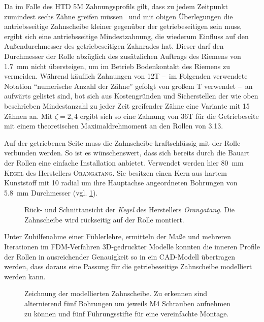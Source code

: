 		Da im Falle des HTD 5M Zahnungsprofils gilt, dass zu jedem Zeitpunkt zumindest sechs Zähne greifen müssen~\cite{MAEDLERGmbH.2021} und mit obigen Überlegungen die antriebsseitige Zahnscheibe kleiner gegenüber der getriebeseitigen sein muss, ergibt sich eine antriebsseitige Mindestzahnung, die wiederum Einfluss auf den Außendurchmesser des getriebeseitigen Zahnrades hat.
		Dieser darf den Durchmesser der Rolle abzüglich des zusätzlichen Auftrags des Riemens von \qty{1,7}{\milli\metre}\cite{gates.catalogue.2021} nicht übersteigen, um im Betrieb Bodenkontakt des Riemens zu vermeiden.
		Während käuflich Zahnungen von 12T --~im Folgenden verwendete Notation ``numerische Anzahl der Zähne'' gefolgt von großem T verwendet --~an aufwärts gelistet sind, bot sich aus Kostengründen und Sicherstellen der wie oben beschrieben Mindestanzahl zu jeder Zeit greifender Zähne eine Variante mit 15 Zähnen an.
		Mit \(\zeta=2,4\) ergibt sich so eine Zahnung von 36T für die Getriebeseite mit einem theoretischen Maximaldrehmoment an den Rollen von \qty{3,13}{\newtonmetre}.\par\medskip
		Auf der getriebenen Seite muss die Zahnscheibe kraftschlüssig mit der Rolle verbunden werden.
		So ist es wünschenswert, dass sich bereits durch die Bauart der Rollen eine einfache Installation anbietet.
		Verwendet werden hier \qty{80}{\milli\metre} \textsc{Kegel} des Herstellers \textsc{Orangatang}.
		Sie besitzen einen Kern aus hartem Kunststoff mit 10 radial um ihre Hauptachse angeordneten Bohrungen von \qty{5,8}{\milli\metre} Durchmesser (vgl. \cref{fig:kegels}).
		\begin{figure}[h]
			\centering
			
			\caption[Rück- und Schnittansicht der \textit{Kegel} des Herstellers \textit{Orangatang}]{Rück- und Schnittansicht der \textit{Kegel} des Herstellers \textit{Orangatang}. Die Zahnscheibe wird rückseitig auf der Rolle montiert.}%
			\label{fig:kegels}
		\end{figure}
		Unter Zuhilfenahme einer Fühlerlehre, ermitteln der Maße und mehreren Iterationen im FDM-Verfahren 3D-gedruckter Modelle konnten die inneren Profile der Rollen in ausreichender Genauigkeit so in ein CAD-Modell übertragen werden, dass daraus eine Passung für die getriebeseitige Zahnscheibe modelliert werden kann.
		\begin{figure}[h]
			\centering
			
			\caption[Zeichnung der modellierten Zahnscheibe]{Zeichnung der modellierten Zahnscheibe. Zu erkennen sind alternierend fünf Bohrungen um jeweils M4 Schrauben aufnehmen zu können und fünf Führungsstifte für eine vereinfachte Montage.}%
			\label{fig:htd 5m driven}
		\end{figure}

